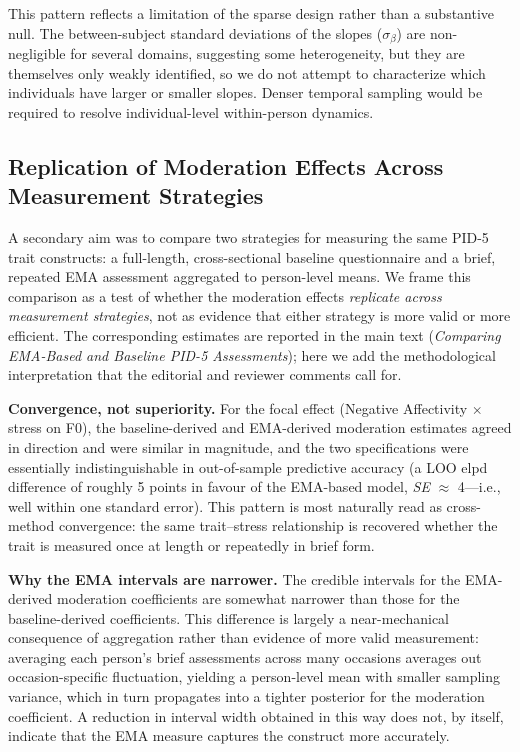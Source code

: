 \documentclass[
  english,
  man,floatsintext]{apa6}
\begin{document}
This pattern reflects a limitation of the sparse design rather than a substantive null. The between-subject standard deviations of the slopes (\(\sigma_\beta\)) are non-negligible for several domains, suggesting some heterogeneity, but they are themselves only weakly identified, so we do not attempt to characterize which individuals have larger or smaller slopes. Denser temporal sampling would be required to resolve individual-level within-person dynamics.

\subsection{Replication of Moderation Effects Across Measurement Strategies}\label{s-replication-measurement}

A secondary aim was to compare two strategies for measuring the same PID-5 trait constructs: a full-length, cross-sectional baseline questionnaire and a brief, repeated EMA assessment aggregated to person-level means. We frame this comparison as a test of whether the moderation effects \emph{replicate across measurement strategies}, not as evidence that either strategy is more valid or more efficient. The corresponding estimates are reported in the main text (\emph{Comparing EMA-Based and Baseline PID-5 Assessments}); here we add the methodological interpretation that the editorial and reviewer comments call for.

\textbf{Convergence, not superiority.} For the focal effect (Negative Affectivity \(\times\) stress on F0), the baseline-derived and EMA-derived moderation estimates agreed in direction and were similar in magnitude, and the two specifications were essentially indistinguishable in out-of-sample predictive accuracy (a LOO elpd difference of roughly 5 points in favour of the EMA-based model, \emph{SE} \(\approx\) 4---i.e., well within one standard error). This pattern is most naturally read as cross-method convergence: the same trait--stress relationship is recovered whether the trait is measured once at length or repeatedly in brief form.

\textbf{Why the EMA intervals are narrower.} The credible intervals for the EMA-derived moderation coefficients are somewhat narrower than those for the baseline-derived coefficients. This difference is largely a near-mechanical consequence of aggregation rather than evidence of more valid measurement: averaging each person's brief assessments across many occasions averages out occasion-specific fluctuation, yielding a person-level mean with smaller sampling variance, which in turn propagates into a tighter posterior for the moderation coefficient. A reduction in interval width obtained in this way does not, by itself, indicate that the EMA measure captures the construct more accurately.
\end{document}
